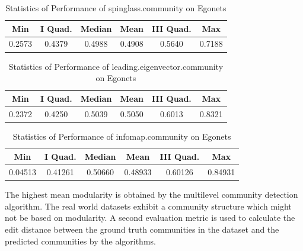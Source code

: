 \begin{table}[!h]
\renewcommand{\arraystretch}{1.3}
\caption{Statistics of Performance of spinglass.community on Egonets}
\label{table}
\centering
\begin{tabular}{|c|c|c|c|c|c|}
  \hline
\multicolumn{1}{|c|}{\textbf{Min}} & \multicolumn{1}{c|}{\textbf{I Quad.}} & \multicolumn{1}{c|}{\textbf{Median}} & \multicolumn{1}{c|}{\textbf{Mean}} & \multicolumn{1}{c|}{\textbf{III Quad.}} & \multicolumn{1}{c|}{\textbf{Max}}        \\
  \hline
  0.2573 & 0.4379 & 0.4988 & 0.4908 & 0.5640 & 0.7188\\
   \hline
\end{tabular}
\end{table}

\begin{table}[!h]
\renewcommand{\arraystretch}{1.3}
\caption{Statistics of Performance of leading.eigenvector.community on Egonets}
\label{table}
\centering
\begin{tabular}{|c|c|c|c|c|c|}
  \hline
\multicolumn{1}{|c|}{\textbf{Min}} & \multicolumn{1}{c|}{\textbf{I Quad.}} & \multicolumn{1}{c|}{\textbf{Median}} & \multicolumn{1}{c|}{\textbf{Mean}} & \multicolumn{1}{c|}{\textbf{III Quad.}} & \multicolumn{1}{c|}{\textbf{Max}}        \\
  \hline
  0.2372 & 0.4250 & 0.5039 & 0.5050 & 0.6013 & 0.8321\\
   \hline
\end{tabular}
\end{table}

\begin{table}[H]
\renewcommand{\arraystretch}{1.3}
\caption{Statistics of Performance of infomap.community on Egonets}
\label{table}
\centering
\begin{tabular}{|c|c|c|c|c|c|}
  \hline
\multicolumn{1}{|c|}{\textbf{Min}} & \multicolumn{1}{c|}{\textbf{I Quad.}} & \multicolumn{1}{c|}{\textbf{Median}} & \multicolumn{1}{c|}{\textbf{Mean}} & \multicolumn{1}{c|}{\textbf{III Quad.}} & \multicolumn{1}{c|}{\textbf{Max}}        \\
  \hline
  0.04513 & 0.41261 & 0.50660 & 0.48933 & 0.60126 & 0.84931\\
   \hline
\end{tabular}
\end{table}

The highest mean modularity is obtained by the multilevel community detection algorithm. The real world datasets exhibit a community structure which might not be based on modularity. A second evaluation metric is used to calculate the edit distance between the ground truth communities in the dataset and the predicted communities by the algorithms.

